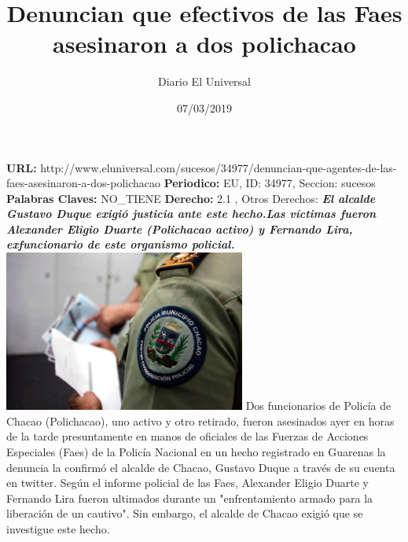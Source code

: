\documentclass{article}%
\title{\textbf{Denuncian que efectivos de las Faes asesinaron a dos polichacao}}%
\author{Diario El Universal}%
\date{07/03/2019}%
\begin{document}
%
\normalsize%
\maketitle%
\textbf{URL: }%
http://www.eluniversal.com/sucesos/34977/denuncian{-}que{-}agentes{-}de{-}las{-}faes{-}asesinaron{-}a{-}dos{-}polichacao\newline%
%
\textbf{Periodico: }%
EU, %
ID: %
34977, %
Seccion: %
sucesos\newline%
%
\textbf{Palabras Claves: }%
NO\_TIENE\newline%
%
\textbf{Derecho: }%
2.1%
, Otros Derechos: %
\newline%
%
\textbf{\textit{El alcalde Gustavo Duque exigió justicia ante este hecho.Las víctimas fueron Alexander Eligio Duarte (Polichacao activo) y Fernando Lira, exfuncionario de este organismo policial.}}%
\newline%
\newline%
%
\includegraphics[width=300px]{EU_34977.jpg}%
\newline%
%
Dos funcionarios de Policía de Chacao (Polichacao), uno activo y otro retirado, fueron asesinados ayer en horas~ de la tarde presuntamente en manos de oficiales de las Fuerzas de Acciones Especiales (Faes) de la Policía Nacional en un hecho registrado en Guarenas la denuncia la confirmó el alcalde de Chacao, Gustavo Duque a través de su cuenta en twitter.%
\newline%
%
Según el informe policial de las Faes, Alexander Eligio Duarte y Fernando Lira fueron ultimados durante un "enfrentamiento armado para la liberación de un cautivo".%
\newline%
%
Sin embargo, el alcalde de Chacao exigió que se investigue este hecho.%
\newline%
%
\end{document}
